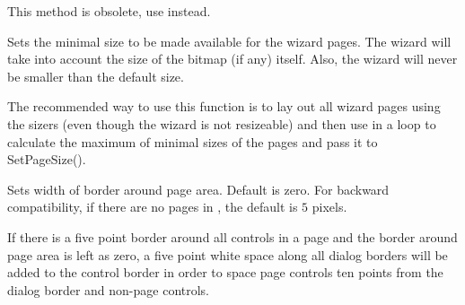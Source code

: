 
This method is obsolete, use
 instead.

Sets the minimal size to be made available for the wizard pages. The wizard
will take into account the size of the bitmap (if any) itself. Also, the
wizard will never be smaller than the default size.

The recommended way to use this function is to lay out all wizard pages using
the sizers (even though the wizard is not resizeable) and then use 
 in a loop to calculate the maximum
of minimal sizes of the pages and pass it to SetPageSize().


\label{wxwizardsetborder}


Sets width of border around page area. Default is zero. For backward
compatibility, if there are no pages in
, the default is $5$ pixels.

If there is a five point border around all controls in a page and the border around
page area is left as zero, a five point white space along all dialog borders
will be added to the control border in order to space page controls ten points from the dialog
border and non-page controls.

